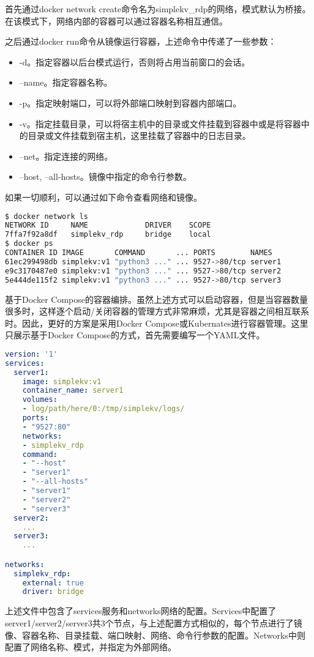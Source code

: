 首先通过docker network create命令名为simplekv\_rdp的网络，模式默认为桥接。在该模式下，网络内部的容器可以通过容器名称相互通信。

之后通过docker run命令从镜像运行容器，上述命令中传递了一些参数：
\begin{itemize}
    \item -d。指定容器以后台模式运行，否则将占用当前窗口的会话。
    \item --name。指定容器名称。
    \item -p。指定映射端口，可以将外部端口映射到容器内部端口。
    \item -v。指定挂载目录，可以将宿主机中的目录或文件挂载到容器中或是将容器中的目录或文件挂载到宿主机，这里挂载了容器中的日志目录。
    \item --net。指定连接的网络。
    \item --host, --all-hosts。镜像中指定的命令行参数。
\end{itemize}

如果一切顺利，可以通过如下命令查看网络和镜像。

\begin{lstlisting}[language=Bash]
$ docker network ls
NETWORK ID     NAME             DRIVER    SCOPE
7ffa7f92a8df   simplekv_rdp     bridge    local
$ docker ps
CONTAINER ID IMAGE       COMMAND       ... PORTS        NAMES
61ec299498db simplekv:v1 "python3 ..." ... 9527->80/tcp server1
e9c3170487e0 simplekv:v1 "python3 ..." ... 9527->80/tcp server2
5e444de115f2 simplekv:v1 "python3 ..." ... 9527->80/tcp server3
\end{lstlisting}

基于Docker Compose的容器编排。虽然上述方式可以启动容器，但是当容器数量很多时，这样逐个启动/关闭容器的管理方式非常麻烦，尤其是容器之间相互联系时。因此，更好的方案是采用Docker Compose或Kubernates进行容器管理。这里只展示基于Docker Compose的方式，首先需要编写一个YAML文件。

\begin{lstlisting}[language=Yaml]
version: '1'
services:
  server1:
    image: simplekv:v1
    container_name: server1
    volumes: 
    - log/path/here/0:/tmp/simplekv/logs/
    ports: 
    - "9527:80"
    networks:
    - simplekv_rdp
    command: 
    - "--host"
    - "server1"
    - "--all-hosts"
    - "server1"
    - "server2"
    - "server3"
  server2:
    ...
  server3:
    ...

networks:
  simplekv_rdp:
    external: true
    driver: bridge
\end{lstlisting}

上述文件中包含了services服务和networks网络的配置。Services中配置了server1/server2/server3共3个节点，与上述配置方式相似的，每个节点进行了镜像、容器名称、目录挂载、端口映射、网络、命令行参数的配置。Networks中则配置了网络名称、模式，并指定为外部网络。

